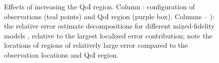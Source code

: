\documentclass[review]{siamart0516}
\providecommand{\DIFaddtex}[1]{{\protect\color{blue} \sf #1}} %
\providecommand{\DIFaddFL}[1]{\DIFadd{#1}} %
\providecommand{\DIFaddbeginFL}{} %
\providecommand{\DIFaddendFL}{} %
\providecommand{\DIFdelbeginFL}{} %
\providecommand{\DIFdelendFL}{} %
\providecommand{\DIFadd}[1]{\texorpdfstring{\DIFaddtex{#1}}{#1}} %
\newcommand{\DIFscaledelfig}{0.5}
\newlength{\DIFdelgraphicswidth} %
\newlength{\DIFdelgraphicsheight} %
\newcommand{\DIFaddincludegraphics}[2][]{{\color{blue}\fbox{\DIFOincludegraphics[#1]{#2}}}} %
\newcommand{\DIFdelincludegraphics}[2][]{%
\sbox{\DIFdelgraphicsbox}{\DIFOincludegraphics[#1]{#2}}%
\settoboxwidth{\DIFdelgraphicswidth}{\DIFdelgraphicsbox} %
\settoboxtotalheight{\DIFdelgraphicsheight}{\DIFdelgraphicsbox} %
\scalebox{\DIFscaledelfig}{%
\parbox[b]{\DIFdelgraphicswidth}{\usebox{\DIFdelgraphicsbox}\\[-\baselineskip] \rule{\DIFdelgraphicswidth}{0em}}\llap{\resizebox{\DIFdelgraphicswidth}{\DIFdelgraphicsheight}{%
\setlength{\unitlength}{\DIFdelgraphicswidth}%
\begin{picture}(1,1)%
\thicklines\linethickness{2pt} %
{\color[rgb]{1,0,0}\put(0,0){\framebox(1,1){}}}%
{\color[rgb]{1,0,0}\put(0,0){\line( 1,1){1}}}%
{\color[rgb]{1,0,0}\put(0,1){\line(1,-1){1}}}%
\end{picture}%
}\hspace*{3pt}}} %
} %
\DeclareRobustCommand{\DIFaddbeginFL}{\DIFOaddbeginFL \let\includegraphics\DIFaddincludegraphics} %
\DeclareRobustCommand{\DIFaddendFL}{\DIFOaddendFL \let\includegraphics\DIFOincludegraphics} %
\DeclareRobustCommand{\DIFdelbeginFL}{\DIFOdelbeginFL \let\includegraphics\DIFdelincludegraphics} %
\DeclareRobustCommand{\DIFdelendFL}{\DIFOaddendFL \let\includegraphics\DIFOincludegraphics} %
\begin{document}
\begin{figure}[htbp]
{}
\captionsetup{justification=centering}
  \DIFaddendFL \caption{Effects of increasing the QoI region. Column \protect\DIFdelbeginFL %
\DIFdelendFL \DIFaddbeginFL \protect{}\DIFaddendFL : configuration of observations (teal points) and QoI region (purple box). Columns \protect\DIFdelbeginFL %
\DIFdelendFL \DIFaddbeginFL \protect{}\DIFaddendFL --\protect\DIFdelbeginFL %
\DIFdelendFL \DIFaddbeginFL \protect{}\DIFaddendFL ): the \DIFaddbeginFL \DIFaddFL{relative }\DIFaddendFL error estimate decompositions for different mixed-fidelity models\DIFaddbeginFL \DIFaddFL{, relative to the largest localized error contribution; note the locations of regions of relatively large error compared to the observation locations and QoI region}\DIFaddendFL .}
  \label{fig:qoiStudy}
\end{figure}
\end{document}

